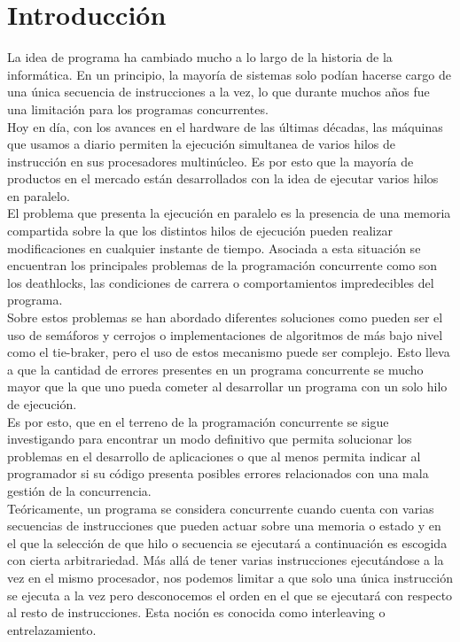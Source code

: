 \chapter{Introducción}
La idea de programa ha cambiado mucho a lo largo de la historia de la informática. En un principio, la mayoría de sistemas solo podían hacerse cargo de una única secuencia de instrucciones a la vez, lo que durante muchos años fue una limitación para los programas concurrentes.\\

Hoy en día, con los avances en el hardware de las últimas décadas, las máquinas que usamos a diario permiten la ejecución simultanea de varios hilos de instrucción en sus procesadores multinúcleo. Es por esto que la mayoría de productos en el mercado están desarrollados con la idea de ejecutar varios hilos en paralelo.\\

El problema que presenta la ejecución en paralelo es la presencia de una memoria compartida sobre la que los distintos hilos de ejecución pueden realizar modificaciones en cualquier instante de tiempo. Asociada a esta situación se encuentran los principales problemas de la programación concurrente como son los deathlocks, las condiciones de carrera o comportamientos impredecibles del programa.\\

Sobre estos problemas se han abordado diferentes soluciones como pueden ser el uso de semáforos y cerrojos o implementaciones de algoritmos de más bajo nivel como el tie-braker, pero el uso de estos mecanismo puede ser complejo. Esto lleva a que la cantidad de errores presentes en un programa concurrente se mucho mayor que la que uno pueda cometer al desarrollar un programa con un solo hilo de ejecución.\\

Es por esto, que en el terreno de la programación concurrente se sigue investigando para encontrar un modo definitivo que permita solucionar los problemas en el desarrollo de aplicaciones o que al menos permita indicar al programador si su código presenta posibles errores relacionados con una mala gestión de la concurrencia.\\

Teóricamente, un programa se considera concurrente cuando cuenta con varias secuencias de instrucciones que pueden actuar sobre una memoria o estado y en el que la selección de que hilo o secuencia se ejecutará a continuación es escogida con cierta arbitrariedad. Más allá de tener varias instrucciones ejecutándose a la vez en el mismo procesador, nos podemos limitar a que solo una única instrucción se ejecuta a la vez pero desconocemos el orden en el que se ejecutará con respecto al resto de instrucciones. Esta noción es conocida como interleaving o entrelazamiento.\\

